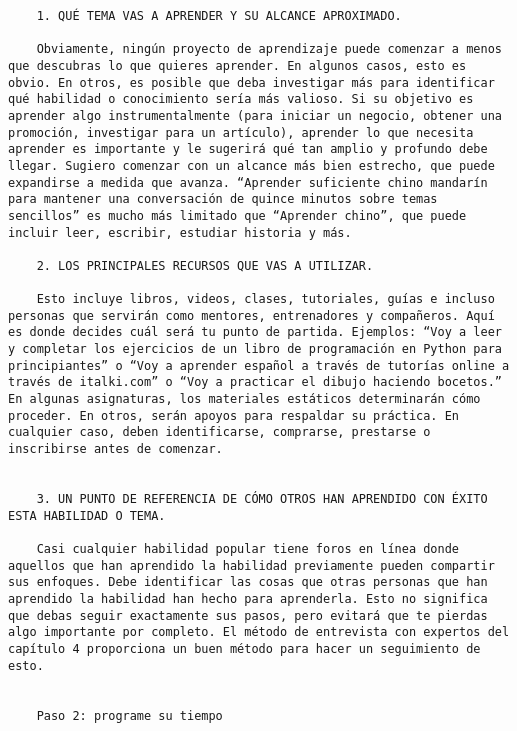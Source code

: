 \begin{verbatim}
	1. QUÉ TEMA VAS A APRENDER Y SU ALCANCE APROXIMADO.
	
	Obviamente, ningún proyecto de aprendizaje puede comenzar a menos que descubras lo que quieres aprender. En algunos casos, esto es obvio. En otros, es posible que deba investigar más para identificar qué habilidad o conocimiento sería más valioso. Si su objetivo es aprender algo instrumentalmente (para iniciar un negocio, obtener una promoción, investigar para un artículo), aprender lo que necesita aprender es importante y le sugerirá qué tan amplio y profundo debe llegar. Sugiero comenzar con un alcance más bien estrecho, que puede expandirse a medida que avanza. “Aprender suficiente chino mandarín para mantener una conversación de quince minutos sobre temas sencillos” es mucho más limitado que “Aprender chino”, que puede incluir leer, escribir, estudiar historia y más.
	
	2. LOS PRINCIPALES RECURSOS QUE VAS A UTILIZAR.
	
	Esto incluye libros, videos, clases, tutoriales, guías e incluso personas que servirán como mentores, entrenadores y compañeros. Aquí es donde decides cuál será tu punto de partida. Ejemplos: “Voy a leer y completar los ejercicios de un libro de programación en Python para principiantes” o “Voy a aprender español a través de tutorías online a través de italki.com” o “Voy a practicar el dibujo haciendo bocetos.” En algunas asignaturas, los materiales estáticos determinarán cómo proceder. En otros, serán apoyos para respaldar su práctica. En cualquier caso, deben identificarse, comprarse, prestarse o inscribirse antes de comenzar.
	
	
	3. UN PUNTO DE REFERENCIA DE CÓMO OTROS HAN APRENDIDO CON ÉXITO ESTA HABILIDAD O TEMA.
	
	Casi cualquier habilidad popular tiene foros en línea donde aquellos que han aprendido la habilidad previamente pueden compartir sus enfoques. Debe identificar las cosas que otras personas que han aprendido la habilidad han hecho para aprenderla. Esto no significa que debas seguir exactamente sus pasos, pero evitará que te pierdas algo importante por completo. El método de entrevista con expertos del capítulo 4 proporciona un buen método para hacer un seguimiento de esto.
	
	
	Paso 2: programe su tiempo
	

\end{verbatim}
